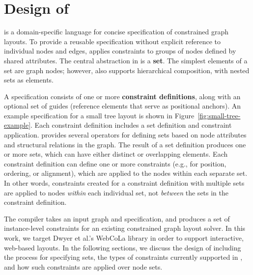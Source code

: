\section{Design of \projectname}
\projectname is a domain-specific language for concise specification of 
constrained graph layouts. To provide a reusable specification 
without explicit reference to individual nodes and edges, \projectname
applies constraints to groups of nodes defined by shared attributes. 
The central abstraction in \projectname is a \textbf{set}. The 
simplest elements of a set are graph nodes; however, \projectname also
supports hierarchical composition, with nested sets as elements.

A \projectname specification consists of one or more \textbf{constraint definitions},
along with an optional set of guides (reference elements that serve as 
positional anchors). An example \projectname specification for a small tree 
layout is shown in Figure~\ref{fig:small-tree-example}. Each constraint 
definition includes a set definition and constraint application.
\projectname provides several operators for defining
sets based on node attributes and structural relations in the graph.
The result of a set definition produces one or more sets, which 
can have either distinct or overlapping elements. Each constraint definition can 
define one or more constraints (e.g., for position, ordering, 
or alignment), which are applied to the nodes within each separate set. 
In other words, constraints created for a constraint definition with multiple sets are 
applied to nodes \emph{within} each individual set, not \emph{between} 
the sets in the constraint definition.

The \projectname compiler takes an input graph 
and specification, and produces a set of instance-level constraints for 
an existing constrained graph layout solver. In this work, we target 
Dwyer et al.'s WebCoLa library \cite{WebCoLa} in order to support
interactive, web-based layouts. In the following sections, 
we discuss the design of \projectname including the process for 
specifying sets, the types of constraints currently supported in \projectname, 
and how such constraints are applied over node sets.

\smallTreeExampleWebCoLa

